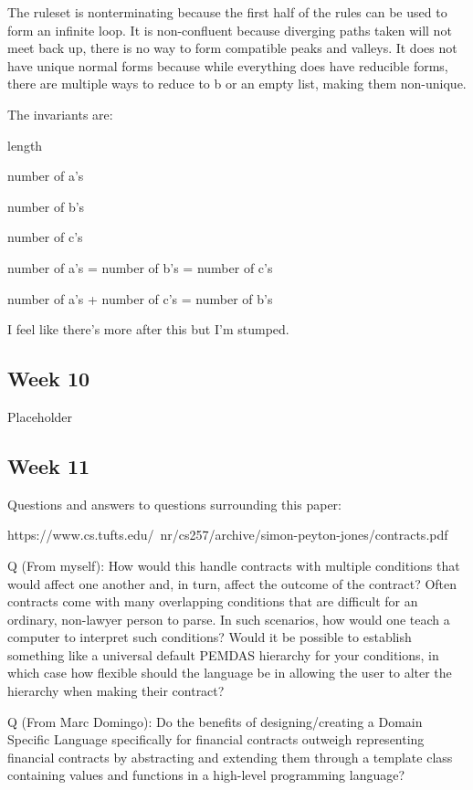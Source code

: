 \documentclass{article}
\theoremstyle{theorem}
\theoremstyle{definition}
\theoremstyle{remark}
\begin{document}
\medskip\noindent
The ruleset is nonterminating because the first half of the rules can be used to form an infinite loop. It is non-confluent because diverging paths taken will not meet back up, there is no way to form compatible peaks and valleys. It does not have unique normal forms because while everything does have reducible forms, there are multiple ways to reduce to b or an empty list, making them non-unique.

\medskip\noindent
The invariants are:

\medskip\noindent
length

\medskip\noindent
number of a's

\medskip\noindent
number of b's

\medskip\noindent
number of c's

\medskip\noindent
number of a's = number of b's = number of c's

\medskip\noindent
number of a's + number of c's = number of b's

\medskip\noindent
I feel like there's more after this but I'm stumped.

\subsection{Week 10}
Placeholder

\subsection{Week 11}
Questions and answers to questions surrounding this paper:

\medskip\noindent
https://www.cs.tufts.edu/~nr/cs257/archive/simon-peyton-jones/contracts.pdf

\medskip\noindent
Q (From myself): How would this handle contracts with multiple conditions that would affect one another and, in turn, affect the outcome of the contract? Often contracts come with many overlapping conditions that are difficult for an ordinary, non-lawyer person to parse. In such scenarios, how would one teach a computer to interpret such conditions? Would it be possible to establish something like a universal  default PEMDAS hierarchy for your conditions, in which case how flexible should the language be in allowing the user to alter the hierarchy when making their contract?

\medskip\noindent
Q (From Marc Domingo): Do the benefits of designing/creating a Domain Specific Language specifically for financial contracts outweigh representing financial contracts by abstracting and extending them through a template class containing values and functions in a high-level programming language?
\end{document}
